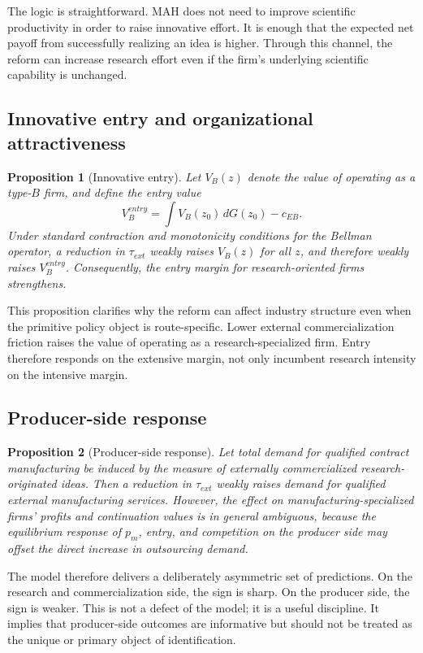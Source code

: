 \documentclass[12pt]{article}
\newtheorem{proposition}{Proposition}
\begin{document}
\noindent
The logic is straightforward. MAH does not need to improve scientific productivity in order to raise innovative effort. It is enough that the expected net payoff from successfully realizing an idea is higher. Through this channel, the reform can increase research effort even if the firm's underlying scientific capability is unchanged.

\subsection{Innovative entry and organizational attractiveness}

\begin{proposition}[Innovative entry]
\label{prop:entry}
Let \(V_B(z)\) denote the value of operating as a type-\(B\) firm, and define the entry value
\[
V_B^{entry}
=
\int V_B(z_0)\,dG(z_0)-c_{EB}.
\]
Under standard contraction and monotonicity conditions for the Bellman operator, a reduction in \(\tau_{ext}\) weakly raises \(V_B(z)\) for all \(z\), and therefore weakly raises \(V_B^{entry}\). Consequently, the entry margin for research-oriented firms strengthens.
\end{proposition}

\noindent
This proposition clarifies why the reform can affect industry structure even when the primitive policy object is route-specific. Lower external commercialization friction raises the value of operating as a research-specialized firm. Entry therefore responds on the extensive margin, not only incumbent research intensity on the intensive margin.

\subsection{Producer-side response}

\begin{proposition}[Producer-side response]
\label{prop:producer}
Let total demand for qualified contract manufacturing be induced by the measure of externally commercialized research-originated ideas. Then a reduction in \(\tau_{ext}\) weakly raises demand for qualified external manufacturing services. However, the effect on manufacturing-specialized firms' profits and continuation values is in general ambiguous, because the equilibrium response of \(p_m\), entry, and competition on the producer side may offset the direct increase in outsourcing demand.
\end{proposition}

\noindent
The model therefore delivers a deliberately asymmetric set of predictions. On the research and commercialization side, the sign is sharp. On the producer side, the sign is weaker. This is not a defect of the model; it is a useful discipline. It implies that producer-side outcomes are informative but should not be treated as the unique or primary object of identification.
\end{document}
